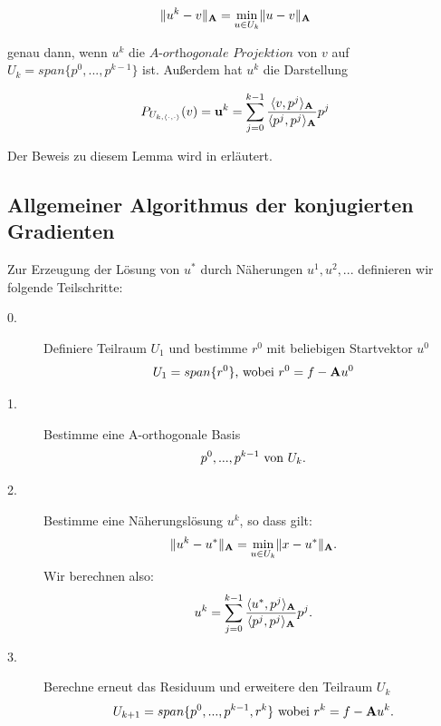 \begin{equation}
\|u^{k} - v\|_{{\textbf{A}}} = \underset{u \in U_{k}}{\min} \|u - v\|_{{\textbf{A}}}
\end{equation}

genau dann, wenn $u^{k}$ die $\textit{A-orthogonale Projektion}$ von $v$ auf $U_{k} = span\{p^{0},...,p^{k-1}\}$ ist. Außerdem hat $u^{k}$ die Darstellung

\begin{equation}
P_{U_{k,\langle \cdot,\cdot \rangle}}(v) = \textbf{u}^{k} = \sum_{j=0}^{k-1} \frac {\langle v, p^{j} \rangle _{{\textbf{A}}}} {\langle p^{j}, p^{j} \rangle _{{\textbf{A}}}} p^{j}
\end{equation}

Der Beweis zu diesem Lemma wird in \cite[S. 567]{DR08} erläutert.

\subsection{Allgemeiner Algorithmus der konjugierten Gradienten}\label{ss.Allgemeiner CG-Algorithmus}

Zur Erzeugung der Lösung von $u^{*}$ durch Näherungen $u^{1}, u^{2},...$ definieren wir folgende Teilschritte:

\begin{description}

\item[0.] Definiere Teilraum $U_{1}$ und bestimme $r^{0}$ mit beliebigen Startvektor $u^{0}$
\begin{equation}
U_{1} = span\{r^{0}\} \textnormal{, wobei } r^{0} = f - {\textbf{A}}u^{0}
\end{equation}

\item[1.] Bestimme eine A-orthogonale Basis
\begin{equation}
p^{0},...,p^{k-1} \textnormal{ von } U_{k}.
\end{equation}

\item[2.] Bestimme eine Näherungslösung $u^{k}$, so dass gilt:
\begin{equation}
\|u^{k} - u^{*}\|_{{\textbf{A}}} = \underset{u \in U_{k}}{\min} \|x - u^{*}\|_{{\textbf{A}}}.
\end{equation}
Wir berechnen also:
\begin{equation}
u^{k} = \sum_{j=0}^{k-1} \frac {\langle u^{*}, p^{j} \rangle _{{\textbf{A}}}} {\langle p^{j}, p^{j} \rangle _{{\textbf{A}}}} p^{j}.\label{eq.Projektion}
\end{equation}

\item[3.] Berechne erneut das Residuum und erweitere den Teilraum $U_{k}$
\begin{equation}
U_{k+1} = span\{p^{0},...,p^{k-1},r^{k}\} \textnormal{ wobei } r^{k} = f - {\textbf{A}}u^{k}.
\end{equation}

\end{description}

